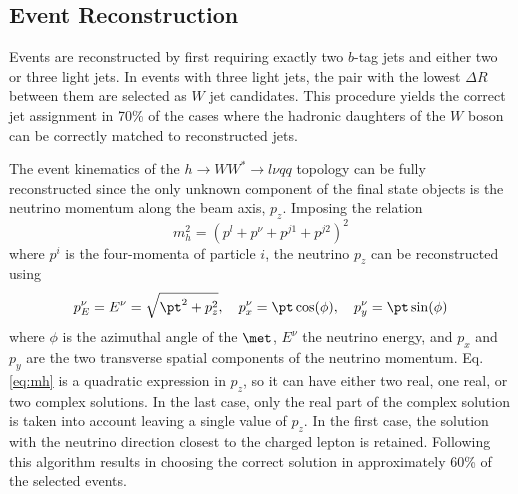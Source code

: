 \subsection{Event Reconstruction}
Events are reconstructed by first requiring exactly two $b$-tag jets and either two or three light jets. In events with three light jets, the pair with the lowest $\Delta R$ between them are selected as $W$ jet candidates. This procedure yields the correct jet assignment in 70\% of the cases where the hadronic daughters of the $W$ boson can be correctly matched to reconstructed jets.%

The event kinematics of the $h \to WW^* \to l \nu qq$ topology can be fully reconstructed since the only unknown component of the final state objects is the neutrino momentum along the beam axis, $p_z$. Imposing the relation
\begin{equation}
\label{eq:mh}
m_h^2 = (p^l + p^{\nu} + p^{j1} + p^{j2})^2
\end{equation}
where $p^i$ is the four-momenta of particle $i$, the neutrino $p_z$ can be reconstructed using 
\[
p_E^{\nu} = E^{\nu} = \sqrt{\pt^2 + p_z^2}, \quad p_x^{\nu} = \pt\cos(\phi), \quad p_y^{\nu} = \pt\sin(\phi)
\]
where $\phi$ is the azimuthal angle of the $\met$, $E^{\nu}$ the neutrino energy, and $p_{x}$ and $p_{y}$ are the two transverse spatial components of the neutrino momentum. Eq. \ref{eq:mh} is a quadratic expression in $p_z$, so it can have either two real, one real, or two complex solutions. In the last case, only the real part of the complex solution is taken into account leaving a single value of $p_z$. In the first case, the solution with the neutrino direction closest to the charged lepton is retained. Following this algorithm results in choosing the correct solution in approximately 60\% of the selected events.%

